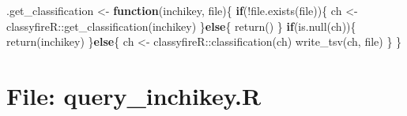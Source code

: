 \documentclass[
]{article}
\newenvironment{Shaded}{\begin{snugshade}}{\end{snugshade}}
\newcommand{\ControlFlowTok}[1]{\textcolor[rgb]{0.13,0.29,0.53}{\textbf{#1}}}
\newcommand{\FunctionTok}[1]{\textcolor[rgb]{0.00,0.00,0.00}{#1}}
\newcommand{\NormalTok}[1]{#1}
\newcommand{\OtherTok}[1]{\textcolor[rgb]{0.56,0.35,0.01}{#1}}
\newcommand{\SpecialCharTok}[1]{\textcolor[rgb]{0.00,0.00,0.00}{#1}}
\begin{document}
\begin{Shaded}
\begin{Highlighting}[]
\NormalTok{.get\_classification }\OtherTok{\textless{}{-}}
  \ControlFlowTok{function}\NormalTok{(inchikey, file)\{}
    \ControlFlowTok{if}\NormalTok{(}\SpecialCharTok{!}\FunctionTok{file.exists}\NormalTok{(file))\{}
\NormalTok{      ch }\OtherTok{\textless{}{-}}\NormalTok{ classyfireR}\SpecialCharTok{::}\FunctionTok{get\_classification}\NormalTok{(inchikey)}
\NormalTok{    \}}\ControlFlowTok{else}\NormalTok{\{}
      \FunctionTok{return}\NormalTok{()}
\NormalTok{    \}}
    \ControlFlowTok{if}\NormalTok{(}\FunctionTok{is.null}\NormalTok{(ch))\{}
      \FunctionTok{return}\NormalTok{(inchikey)}
\NormalTok{    \}}\ControlFlowTok{else}\NormalTok{\{}
\NormalTok{      ch }\OtherTok{\textless{}{-}}\NormalTok{ classyfireR}\SpecialCharTok{::}\FunctionTok{classification}\NormalTok{(ch)}
      \FunctionTok{write\_tsv}\NormalTok{(ch, file)}
\NormalTok{    \}}
\NormalTok{  \}}
\end{Highlighting}
\end{Shaded}

\hypertarget{file-query_inchikey.r}{%
\section{File: query\_inchikey.R}\label{file-query_inchikey.r}}
\end{document}
